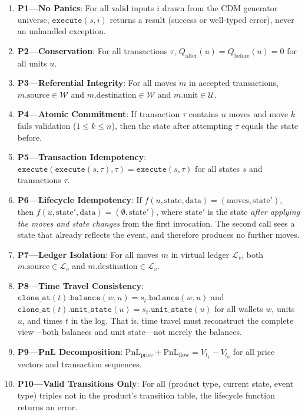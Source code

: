 \documentclass[11pt,a4paper]{article}
\begin{document}
\begin{enumerate}
\item \textbf{P1---No Panics}: For all valid inputs $i$ drawn from the CDM generator universe, $\texttt{execute}(s, i)$ returns a result (success or well-typed error), never an unhandled exception.

\item \textbf{P2---Conservation}: For all transactions $\tau$, $Q_{\text{after}}(u) = Q_{\text{before}}(u) = 0$ for all units $u$.

\item \textbf{P3---Referential Integrity}: For all moves $m$ in accepted transactions, $m.\text{source} \in \mathcal{W}$ and $m.\text{destination} \in \mathcal{W}$ and $m.\text{unit} \in \mathcal{U}$.

\item \textbf{P4---Atomic Commitment}: If transaction $\tau$ contains $n$ moves and move $k$ fails validation ($1 \leq k \leq n$), then the state after attempting $\tau$ equals the state before.

\item \textbf{P5---Transaction Idempotency}: $\texttt{execute}(\texttt{execute}(s, \tau), \tau) = \texttt{execute}(s, \tau)$ for all states $s$ and transactions $\tau$.

\item \textbf{P6---Lifecycle Idempotency}: If $f(u, \text{state}, \text{data}) = (\text{moves}, \text{state}')$, then $f(u, \text{state}', \text{data}) = (\emptyset, \text{state}')$, where $\text{state}'$ is the state \emph{after applying the moves and state changes} from the first invocation. The second call sees a state that already reflects the event, and therefore produces no further moves.

\item \textbf{P7---Ledger Isolation}: For all moves $m$ in virtual ledger $\mathcal{L}_v$, both $m.\text{source} \in \mathcal{L}_v$ and $m.\text{destination} \in \mathcal{L}_v$.

\item \textbf{P8---Time Travel Consistency}: $\texttt{clone\_at}(t).\texttt{balance}(w, u) = s_t.\texttt{balance}(w, u)$ and $\texttt{clone\_at}(t).\texttt{unit\_state}(u) = s_t.\texttt{unit\_state}(u)$ for all wallets $w$, units $u$, and times $t$ in the log. That is, time travel must reconstruct the complete view---both balances and unit state---not merely the balances.

\item \textbf{P9---PnL Decomposition}: $\text{PnL}_{\text{price}} + \text{PnL}_{\text{flow}} = V_{t_1} - V_{t_0}$ for all price vectors and transaction sequences.

\item \textbf{P10---Valid Transitions Only}: For all (product type, current state, event type) triples not in the product's transition table, the lifecycle function returns an error.
\end{enumerate}
\end{document}
